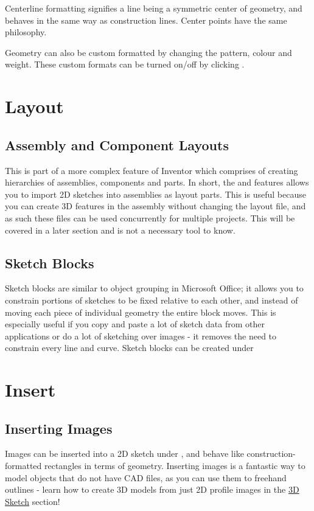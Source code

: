 \begin{enumerate}
Centerline formatting signifies a line being a symmetric center of geometry, and behaves in the same way as construction lines. Center points have the same philosophy.

Geometry can also be custom formatted by changing the pattern, colour and weight. These custom formats can be turned on/off by clicking .

\section{Layout}

\subsection{Assembly and Component Layouts}
\harddifficulty

This is part of a more complex feature of Inventor which comprises of creating hierarchies of assemblies, components and parts. In short, the  and \newline {} features allows you to import 2D sketches into assemblies as layout parts. This is useful because you can create 3D features in the assembly without changing the layout file, and as such these files can be used concurrently for multiple projects. This will be covered in a later section and is not a necessary tool to know.

\subsection{Sketch Blocks}
\label{subsec:sketch-block}

\mediumdifficulty
Sketch blocks are similar to object grouping in Microsoft Office; it allows you to constrain portions of sketches to be fixed relative to each other, and instead of moving each piece of individual geometry the entire block moves. This is especially useful if you copy and paste a lot of sketch data from other applications or do a lot of sketching over images - it removes the need to constrain every line and curve. Sketch blocks can be created under 

\section{Insert}
\label{section:insert}
\subsection{Inserting Images}
\easydifficulty
Images can be inserted into a 2D sketch under , and behave like \newline construction-formatted rectangles in terms of geometry. Inserting images is a fantastic way to model objects that do not have CAD files, as you can use them to freehand outlines - learn how to create 3D models from just 2D profile images in the \hyperref[section: 3D Sketches]{3D Sketch} section!



\end{enumerate}

